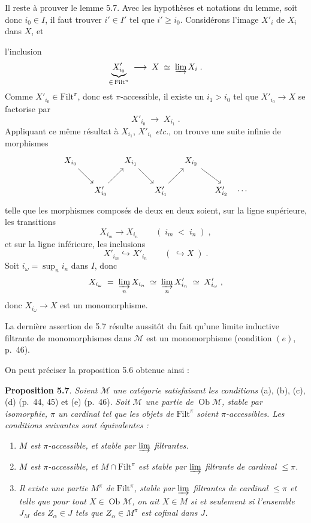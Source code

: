 \documentclass[11pt]{article}
\newcommand{\printedpage}[1]{\marginpar{\footnotesize p.~#1}}
\newcommand{\msp}[1]{\marginpar{\footnotesize [#1]}}
\newcommand{\M}{\mathcal{M}}
\newcommand{\Filt}{\mathrm{Filt}}
\newcommand{\Ob}{\operatorname{Ob}}
\begin{document}
\msp{page 56}
Il reste à prouver le lemme 5.7. Avec les hypothèses et notations du lemme, soit donc $i_0 \in I$, il faut trouver $i' \in I'$ tel que $i' \geq i_0$. Considérons l'image $X'_i$ de $X_i$ dans $X$, et

\printedpage{34}
l'inclusion
\[
\underbrace{X'_{i_0}}_{\in\, \Filt^\pi} \;\longrightarrow\; X \;\simeq\; \varinjlim X_i \;.
\]
Comme $X'_{i_0} \in \Filt^\pi$, donc est $\pi$-accessible, il existe un $i_1 > i_0$ tel que $X'_{i_0} \longrightarrow X$ se factorise par
\[
X'_{i_0} \;\longrightarrow\; X_{i_1} \;.
\]
Appliquant ce même résultat à $X_{i_1}$, $X'_{i_1}$ \textit{etc.}, on trouve une suite infinie de morphismes
\[
\begin{tikzcd}[column sep=small]
X_{i_0} \arrow[dr] & & X_{i_1} \arrow[dr] & & X_{i_2} \arrow[dr] & \\
& X'_{i_0} \arrow[ur] & & X'_{i_1} \arrow[ur] & & X'_{i_2} \quad \cdots
\end{tikzcd}
\]
telle que les morphismes composés de deux en deux soient, sur la ligne supérieure, les transitions
\[
X_{i_m} \longrightarrow X_{i_n} \qquad (\; i_m \;<\; i_n \;) \;,
\]
et sur la ligne inférieure, les inclusions
\[
X'_{i_m} \hookrightarrow X'_{i_n} \qquad (\; \hookrightarrow X \;) \;.
\]
Soit $i_\omega = \sup_n i_n$ dans $I$, donc
\[
X_{i_\omega} \;=\; \varinjlim_{n} X_{i_n} \;\simeq\; \varinjlim_{n} X'_{i_n} \;\simeq\; X'_{i_\omega} \;,
\]
donc $X_{i_\omega} \longrightarrow X$ est un monomorphisme.

\msp{page 57}

La dernière assertion de 5.7 résulte aussitôt du fait qu'une limite inductive filtrante de monomorphismes dans $\M$ est un monomorphisme (condition $(e)$, p.~46).

On peut préciser la proposition 5.6 obtenue ainsi :

\textbf{Proposition 5.7}. \textit{Soient $\M$ une catégorie satisfaisant les conditions} (a), (b), (c), (d) (p.~44, 45) et (e) (p.~46). \textit{Soit $\M$ une partie de} $\Ob\M$\textit{, stable par isomorphie, $\pi$ un cardinal tel que les objets de} $\Filt^\pi$ \textit{soient $\pi$-accessibles. Les conditions suivantes sont équivalentes :} %

\begin{enumerate}[label={}]
\item[a)] \textit{$M$ est $\pi$-accessible, et stable par $\varinjlim$ filtrantes.}
\item[b)] \textit{$M$ est $\pi$-accessible, et $M \cap \Filt^\pi$ est stable par $\varinjlim$ filtrante de cardinal $\leq \pi$.}
\item[c)] \textit{Il existe une partie $M^\pi$ de} $\Filt^\pi$\textit{, stable par $\varinjlim$ filtrantes de cardinal $\leq \pi$ et telle que pour tout $X \in \Ob\M$, on ait $X \in M$ si et seulement si l'ensemble $J_M$ des $Z_\alpha \in J$ tels que $Z_\alpha \in M^\pi$ est cofinal dans $J$.}
\end{enumerate}
\end{document}
